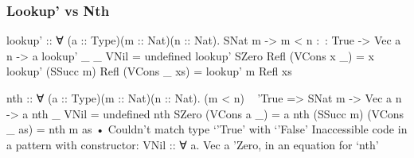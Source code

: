 \documentclass{beamer}
\begin{document}
\begin{frame}[fragile]\frametitle{Lookup' vs Nth}
\begin{semiverbatim}
lookup' :: ∀ (a :: Type)(m :: Nat)(n :: Nat).
           SNat m -> m < n :~: True -> Vec a n -> a
lookup' _         _     VNil        = undefined
lookup' SZero     Refl (VCons x _)  = x
lookup' (SSucc m) Refl (VCons _ xs) = lookup' m Refl xs

nth :: ∀ (a :: Type)(m :: Nat)(n :: Nat).
       (m < n) ~ 'True => SNat m -> Vec a n -> a
nth _         VNil         =  undefined
nth SZero     (VCons a _)  = a
nth (SSucc m) (VCons _ as) = nth m as
  • Couldn't match type ‘'True’ with ‘'False’
    Inaccessible code in
      a pattern with constructor: VNil :: ∀ a. Vec a 'Zero,
      in an equation for ‘nth’
\end{semiverbatim}
\end{frame}

\begin{frame}[fragile]\frametitle{}
\begin{semiverbatim}
\end{semiverbatim}
\end{frame}
\end{document}
